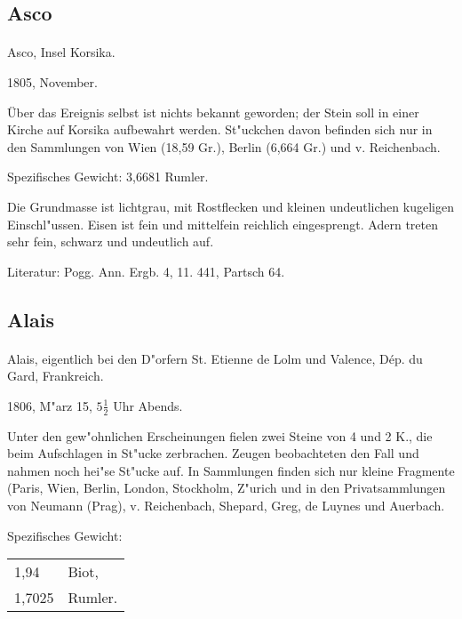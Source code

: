 \documentclass[a4paper, 11pt, oneside]{article}
\begin{document}
\subsection{Asco}
\normalsize
\paragraph{}
Asco, Insel Korsika.

1805, November.

Über das Ereignis selbst ist nichts bekannt geworden; der Stein soll in einer Kirche auf Korsika aufbewahrt werden. St"uckchen davon befinden sich nur in den Sammlungen von Wien (18,59 Gr.), Berlin (6,664 Gr.) und v. Reichenbach.

Spezifisches Gewicht: 3,6681 Rumler.

Die Grundmasse ist lichtgrau, mit Rostflecken und kleinen undeutlichen kugeligen Einschl"ussen. Eisen ist fein und mittelfein reichlich eingesprengt. Adern treten sehr fein, schwarz und undeutlich auf.

Literatur: Pogg. Ann. Ergb. 4, 11. 441, Partsch 64.

\subsection{Alais}
\normalsize
\paragraph{}
Alais, eigentlich bei den D"orfern St. Etienne de Lolm und Valence, Dép. du Gard, Frankreich.

1806, M"arz 15, $5\frac{1}{2}$ Uhr Abends.

Unter den gew"ohnlichen Erscheinungen fielen zwei Steine von 4 und 2 K., die beim Aufschlagen in St"ucke zerbrachen. Zeugen beobachteten den Fall und nahmen noch hei"se St"ucke auf. In Sammlungen finden sich nur kleine Fragmente (Paris, Wien, Berlin, London, Stockholm, Z"urich und in den Privatsammlungen von Neumann (Prag), v. Reichenbach, Shepard, Greg, de Luynes und Auerbach.

Spezifisches Gewicht:
\begin{table}[!ht]
    \centering
    \begin{tabular}{l l}
        1,94 & Biot,\\
        1,7025 & Rumler.
    \end{tabular}
\end{table}
\end{document}
